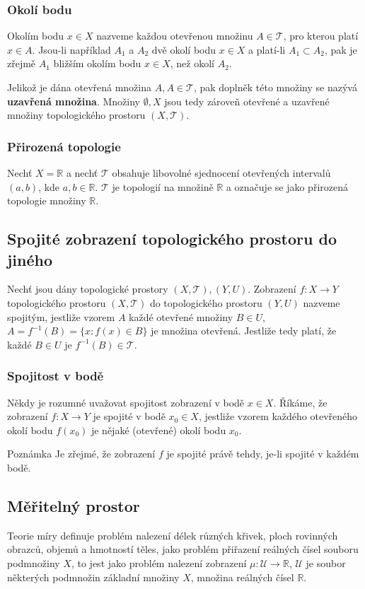 	\subsubsection{Okolí bodu}
	Okolím bodu $x\in X$ nazveme každou otevřenou množinu $A\in\mathscr{T}$, pro kterou platí $x\in A$. Jsou-li například $A_1$ a $A_2$  dvě okolí bodu $x\in X$ a platí-li $A_1\subset A_2$, pak je zřejmě $A_1$ bližším okolím bodu $x\in X$, než okolí $A_2$.\br
	
	Jelikož je dána otevřená množina $A,A\in\mathscr{T}$, pak doplněk této množiny se nazývá \textbf{uzavřená množina}. Množiny $\emptyset, X$ jsou tedy zároveň otevřené a uzavřené množiny topologického prostoru $(X,\mathscr{T})$.
	
	\subsubsection{Přirozená topologie}
	Nechť $X=\mathbb{R}$ a nechť $\mathscr{T}$ obsahuje libovolné sjednocení otevřených intervalů $(a,b)$, kde $a,b\in\mathbb{R}$. $\mathscr{T}$ je topologií na množině $\mathbb{R}$ a označuje se jako přirozená topologie množiny $\mathbb{R}$.
	
	\subsection{Spojité zobrazení topologického prostoru do jiného}
	Nechť jsou dány topologické prostory $(X,\mathscr{T}), (Y,U)$. Zobrazení $f: X\to Y$ topologického prostoru $(X,\mathscr{T})$ do topologického prostoru $(Y,U)$ nazveme spojitým, jestliže vzorem $A$ každé otevřené množiny $B\in U$, $A=f^{-1}(B)=\{x:f(x)\in B\}$ je množina otevřená. Jestliže tedy platí, že každé $B\in U$ je $f^{-1}(B)\in\mathscr{T}$.\br
	
	\subsubsection{Spojitost v bodě}
	Někdy je rozumné uvažovat spojitost zobrazení v bodě $x\in X$. Říkáme, že zobrazení $f: X\to Y$ je spojité v bodě $x_0\in X$, jestliže vzorem každého otevřeného okolí bodu $f(x_0)$ je nějaké (otevřené) okolí bodu $x_0$.
	
	\begin{note}{Poznámka}
	Je zřejmé, že zobrazení $f$ je spojité právě tehdy, je-li spojité v každém bodě.
	\end{note}
	
	\subsection{Měřitelný prostor}
	Teorie míry definuje problém nalezení délek různých křivek, ploch rovinných obrazců, objemů a hmotností těles, jako problém přiřazení reálných čísel souboru podmnožiny $X$, to jest jako problém nalezení zobrazení $\mu: \mathscr{U}\to\mathbb{R}$, $\mathscr{U}$ je soubor některých podmnožin základní množiny $X$, množina reálných čísel $\mathbb{R}$.\br
	
